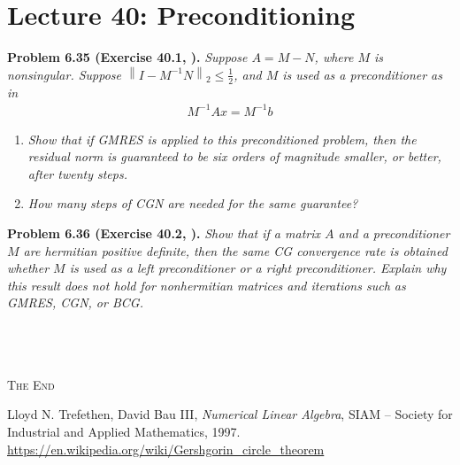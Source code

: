 \documentclass[a4paper,oneside]{book}
\numberwithin{equation}{chapter}
\begin{document}
\section{Lecture 40: Preconditioning}
\textbf{Problem 6.35 (Exercise 40.1, \cite{1}).} \textit{Suppose $A=M-N$, where $M$ is nonsingular. Suppose ${\left\| {I - {M^{ - 1}}N} \right\|_2} \le \frac{1}{2}$, and $M$ is used as a preconditioner as in}
\begin{align}
{M^{ - 1}}Ax = {M^{ - 1}}b
\end{align}
\begin{enumerate}
\item \textit{Show that if GMRES is applied to this preconditioned problem, then the residual norm is guaranteed to be six orders of magnitude smaller, or better, after twenty steps.}
\item \textit{How many steps of CGN are needed for the same guarantee?}
\end{enumerate}
\textbf{Problem 6.36 (Exercise 40.2, \cite{1}).} \textit{Show that if a matrix $A$ and a preconditioner $M$ are hermitian positive definite, then the same CG convergence rate is obtained whether $M$ is used as a left preconditioner or a right preconditioner. Explain why this result does not hold  for nonhermitian matrices and iterations such as GMRES, CGN, or BCG.}\\
\\
\\
\\
\begin{center}
\textsc{The End}
\end{center}
\newpage
\begin{thebibliography}{999}
 Lloyd N. Trefethen, David Bau III, \textit{Numerical Linear Algebra}, SIAM – Society for Industrial and Applied Mathematics, 1997. 
 \url{https://en.wikipedia.org/wiki/Gershgorin_circle_theorem}
\end{thebibliography}
\end{document}
